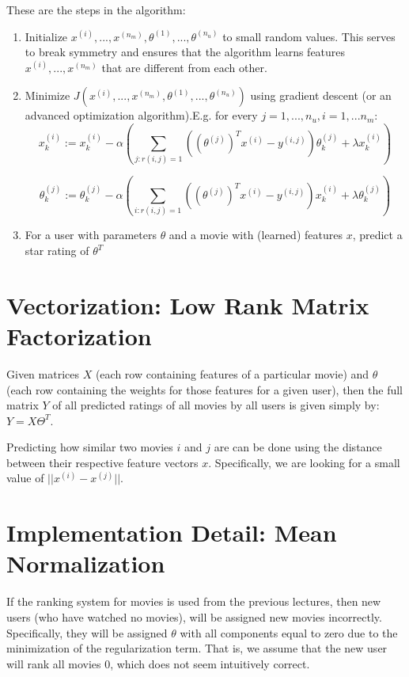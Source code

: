 These are the steps in the algorithm:

\begin{enumerate}
\item Initialize $x^{(i)},...,x^{(n_m)},\theta^{(1)},...,\theta^{(n_u)}$ to small random values. This serves to break symmetry and ensures that the algorithm learns features $x^{(i)},...,x^{(n_m)}$ that are different from each other.
\item Minimize $J(x^{(i)},...,x^{(n_m)},\theta^{(1)},...,\theta^{(n_u)})$ using gradient descent (or an advanced optimization algorithm).E.g. for every $j=1,...,n_u,i=1,...n_m$:$$x_k^{(i)} := x_k^{(i)} - \alpha\left (\displaystyle \sum_{j:r(i,j)=1}{((\theta^{(j)})^T x^{(i)} - y^{(i,j)}) \theta_k^{(j)}} + \lambda x_k^{(i)} \right)$$

$$\theta_k^{(j)} := \theta_k^{(j)} - \alpha\left (\displaystyle \sum_{i:r(i,j)=1}{((\theta^{(j)})^T x^{(i)} - y^{(i,j)}) x_k^{(i)}} + \lambda \theta_k^{(j)} \right)$$
\item For a user with parameters $\theta$ and a movie with (learned) features $x$, predict a star rating of $\theta^T$
\end{enumerate}

\section{Vectorization: Low Rank Matrix Factorization}
Given matrices $X$ (each row containing features of a particular movie) and $\theta$ (each row containing the weights for those features for a given user), then the full matrix $Y$ of all predicted ratings of all movies by all users is given simply by: $Y = X\Theta^T$.

Predicting how similar two movies $i$ and $j$ are can be done using the distance between their respective feature vectors $x$. Specifically, we are looking for a small value of $||x^{(i)} - x^{(j)}||$.

\section{Implementation Detail: Mean Normalization}
If the ranking system for movies is used from the previous lectures, then new users (who have watched no movies), will be assigned new movies incorrectly. Specifically, they will be assigned $\theta$ with all components equal to zero due to the minimization of the regularization term. That is, we assume that the new user will rank all movies 0, which does not seem intuitively correct.

